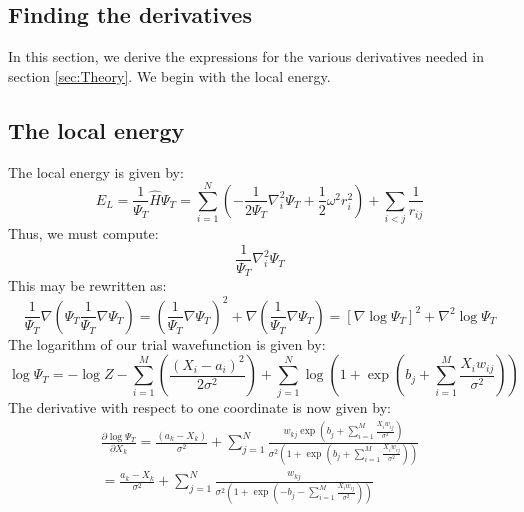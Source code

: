 \documentclass[a4paper, 10pt]{article}
\begin{document}
	
	
	\pagebreak
	\begin{appendices}
	\section{Finding the derivatives}\label{ap:finding_derivatives}
	In this section, we derive the expressions for the various derivatives needed in section \ref{sec:Theory}. We begin with the local energy.
	\subsection{The local energy}\label{ap:local_energy}
	The local energy is given by:
	\begin{equation}\label{eq:ap_local_energy}
	E_L=\frac{1}{\Psi_T}\hat{H}\Psi_T= \sum_{i=1}^N \left(-\frac{1}{2\Psi_T}\nabla_i^2 \Psi_T + \frac{1}{2}\omega^2 r_i^2\right)+\sum_{i<j} \frac{1}{r_{ij}}
	\end{equation}
	Thus, we must compute:
	\begin{equation}
	\frac{1}{\Psi_T}\nabla_i^2 \Psi_T
	\end{equation}
	This may be rewritten as:
	\begin{equation}\label{eq:log_expression_for_trial_wavefunction}
	\frac{1}{\Psi_T}\nabla \left(\Psi_T \frac{1}{\Psi_T} \nabla\Psi_T\right)=\left(\frac{1}{\Psi_T}\nabla \Psi_T\right)^2+\nabla \left(\frac{1}{\Psi_T}\nabla \Psi_T \right)=\left[\nabla \log \Psi_T\right]^2 + \nabla^2 \log \Psi_T
	\end{equation}
	The logarithm of our trial wavefunction is given by:
	\begin{equation}\label{eq:logarithm_of_wavefunction}
	\log \Psi_T = -\log Z -\sum_{i=1}^M \left(\frac{(X_i-a_i)^2}{2\sigma^2}\right)+\sum_{j=1}^N \log \left(1+\exp \left(b_j+\sum_{i=1}^{M} \frac{X_iw_{ij}}{\sigma^2}\right)\right)
	\end{equation}
	The derivative with respect to one coordinate is now given by:
	\begin{equation}\label{eq:first_derivative_log_psi}
	\begin{split}
	\frac{\partial \log \Psi_T}{\partial X_k}=\frac{(a_k-X_k)}{\sigma^2}+\sum_{j=1}^N \frac{w_{kj} \exp \left(b_j+\sum_{i=1}^{M} \frac{X_iw_{ij}}{\sigma^2}\right)}{\sigma^2 \left(1+\exp \left(b_j+\sum_{i=1}^{M} \frac{X_iw_{ij}}{\sigma^2}\right)\right)}\\
	=\frac{a_k-X_k}{\sigma^2}+\sum_{j=1}^N \frac{w_{kj}}{\sigma^2 \left(1+ \exp \left(-b_j-\sum_{i=1}^{M} \frac{X_iw_{ij}}{\sigma^2}\right)\right)}

\end{split}
\end{equation}
\end{appendices}
\end{document}
